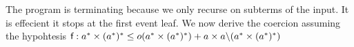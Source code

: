 \documentclass[a4paper,UKenglish,cleveref, autoref, thm-restate]{lipics-v2021}
\begin{document}
The program is terminating because we only recurse on subterms of the input. It is effecient it stops at the first event leaf. We now derive the coercion assuming the hypohtesis $\textsf{f} : a^* \times ({a^*})^* \leq o(a^* \times ({a^*})^*) + a \times a \backslash (a^* \times ({a^*})^*)$
\end{document}
